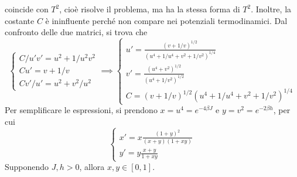 \documentclass[11pt, a4paper]{scrartcl}
\theoremstyle{style}
\theoremstyle{style1}
\numberwithin{equation}{subsection}
\begin{document}
coincide con $T^2$, cio\`e risolve il problema, ma ha la stessa forma di $T^2$.
Inoltre, la costante $C$ \`e ininfluente perch\'e non compare nei potenziali termodinamici.
Dal confronto delle due matrici, si trova che
\[
\begin{cases}
	C / u' v' = u^2 + 1 / u^2 v^2 \\
	C u' =  v + 1 / v \\
	C v ' / u ' = u^2 + v^2 / u^2
\end{cases}\implies \begin{cases}
	\displaystyle u'= \frac{\left(v+1 / v\right) ^{1 / 2}}{\left(u^4 + 1 / u^4 + v^2 + 1 / v^2\right) ^{1 / 4}}\\
	\displaystyle v' = \frac{(u^4 + v^2 ) ^{1 / 2}}{(u^4 + 1 / v^2 ) ^{ 1 / 2}}\\
	C = (v+ 1 / v )^{ 1/2} (u^4 + 1 / u^4 + v^2 + 1 / v^2 ) ^{1 / 4}
\end{cases}
\] 
Per semplificare le espressioni, si prendono $x = u^4=e^{-4 \beta J}$ e $y = v^2= e^{-2\beta  h}$, per cui
\[
\begin{cases}
	\displaystyle x' = x \frac{(1+y)^2}{(x+y)(1+xy)}\\
	\displaystyle y' = y \frac{x+y}{1+xy}
\end{cases}
\]
Supponendo $J,h >0 $, allora $x,y \in [0,1]$.
\end{document}
